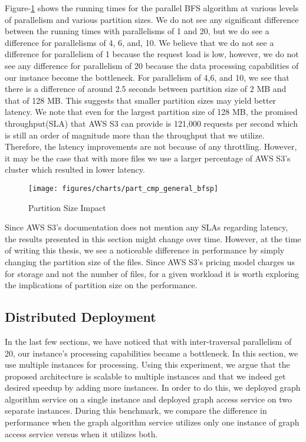 \smallskip
Figure-\ref{fig:partitionSizeImp} shows the running times for the parallel BFS
algorithm at various levels of parallelism and various partition sizes. We do
not see any significant difference between the running times with parallelisms of
1 and 20, but we do see a difference for parallelisms of 4, 6, and, 10.
We believe that we do not see a difference for parallelism of 1 because the
request load is low, however, we do not see any difference for parallelism of 20
because the data processing capabilities of our instance become the bottleneck.
For parallelism of 4,6, and 10, we see that there is a difference of around 2.5
seconds between partition size of 2 MB and that of 128 MB. This suggests that
smaller partition sizes may yield better latency. We note that even for the
largest partition size of 128 MB, the promised throughput(SLA) that AWS S3 can
provide is
121,000 requests per second which is still an order of magnitude more than the
throughput that we utilize. Therefore, the latency improvements are not because
of any throttling. However, it may be the case that with more files we use
a larger percentage of AWS S3's cluster which resulted in lower
latency.
\begin{figure}[ht]
    \centering
    \texttt{[image: figures/charts/part\_cmp\_general\_bfsp]}
    \caption{Partition Size Impact}
    \label{fig:partitionSizeImp}
\end{figure}

\medskip
Since AWS S3's documentation does not mention any SLAs regarding latency,
the results presented in this section might change over time. However, at the time of
writing this thesis, we see a noticeable difference in performance by simply
changing the partition size of the files. Since AWS S3's pricing model charges
us for storage and not the number of files, for a given workload it is
worth exploring the implications of partition size on the performance.

\subsection{Distributed Deployment}\label{sec:distDeploy}
In the last few sections, we have noticed that with inter-traversal parallelism
of 20, our instance's processing capabilities became a bottleneck. In this
section, we use multiple instances for processing. Using this experiment, we
argue that the proposed architecture is scalable to multiple instances and that
we indeed get desired speedup by adding more instances. In order to do this, we
deployed graph algorithm service on a single instance and deployed graph access
service on two separate instances. During this benchmark, we compare the
difference in performance when the graph algorithm service utilizes only one
instance of graph access service versus when it utilizes both.


